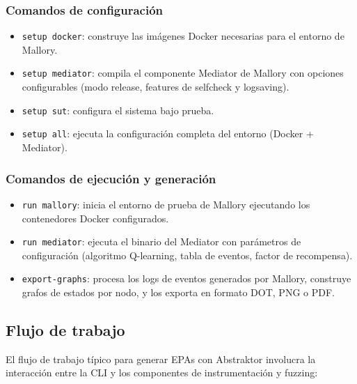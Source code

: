 \documentclass[12pt]{article}
\begin{document}
\subsubsection{Comandos de configuración}

\begin{itemize}
    \item \texttt{setup docker}: construye las imágenes Docker necesarias para el entorno de Mallory.
    
    \item \texttt{setup mediator}: compila el componente Mediator de Mallory con opciones configurables (modo release, features de selfcheck y logsaving).
    
    \item \texttt{setup sut}: configura el sistema bajo prueba.
    
    \item \texttt{setup all}: ejecuta la configuración completa del entorno (Docker + Mediator).
\end{itemize}

\subsubsection{Comandos de ejecución y generación}

\begin{itemize}
    \item \texttt{run mallory}: inicia el entorno de prueba de Mallory ejecutando los contenedores Docker configurados.
    
    \item \texttt{run mediator}: ejecuta el binario del Mediator con parámetros de configuración (algoritmo Q-learning, tabla de eventos, factor de recompensa).
    
    \item \texttt{export-graphs}: procesa los logs de eventos generados por Mallory, construye grafos de estados por nodo, y los exporta en formato DOT, PNG o PDF.
\end{itemize}

\subsection{Flujo de trabajo}

El flujo de trabajo típico para generar EPAs con Abstraktor involucra la interacción entre la CLI y los componentes de instrumentación y fuzzing:

\vspace{0.5cm}
\end{document}
